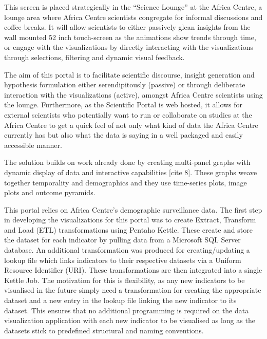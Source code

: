 This screen is placed strategically in the “Science Lounge” at the Africa Centre, a lounge area where Africa Centre scientists congregate for informal discussions and coffee breaks. It will allow scientists to either passively glean insights from the wall mounted 52 inch touch-screen as the animations show trends through time, or engage with the visualizations by directly interacting with the visualizations through selections, filtering and dynamic visual feedback. 

The aim of this portal is to facilitate scientific discourse, insight generation and hypothesis formulation either serendipitously (passive) or through deliberate interaction with the visualizations (active), amongst Africa Centre scientists using the lounge.
Furthermore, as the Scientific Portal is web hosted, it allows for external scientists who potentially want to run or collaborate on studies at the Africa Centre to get a quick feel of not only what kind of data the Africa Centre currently has but also what the data is saying in a well packaged and easily accessible manner.

The solution builds on work already done by creating multi-panel graphs with dynamic display of data and interactive capabilities [cite 8]. These graphs weave together temporality and demographics and they use time-series plots, image plots and outcome pyramids.

This portal relies on Africa Centre’s demographic surveillance data.  The first step in developing the visualizations for this portal was to create Extract, Transform and Load (ETL) transformations using Pentaho Kettle. These create and store the dataset for each indicator by pulling data from a Microsoft SQL Server database. An additional transformation was produced for creating/updating a lookup file which links indicators to their respective datasets via a Uniform Resource Identifier (URI). These transformations are then integrated into a single Kettle Job. The motivation for this is flexibility, as any new indicators to be visualised in the future simply need a transformation for creating the appropriate dataset and a new entry in the lookup file linking the new indicator to its dataset. This ensures that no additional programming is required on the data visualization application with each new indicator to be visualised as long as the datasets stick to predefined structural and naming conventions.

